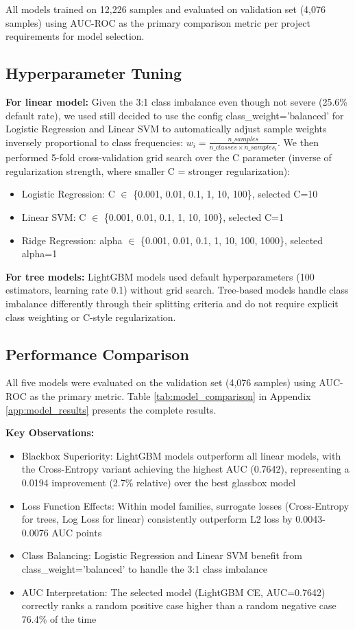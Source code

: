 \documentclass[12pt]{article}
\begin{document}
All models trained on 12,226 samples and evaluated on validation set (4,076 samples) using AUC-ROC as the primary comparison metric per project requirements for model selection.

\subsection{Hyperparameter Tuning} 

\textbf{For linear model: }Given the 3:1 class imbalance even though not severe (25.6\% default rate), we used still decided to use the config class\_weight='balanced' for Logistic Regression and Linear SVM to automatically adjust sample weights inversely proportional to class frequencies: $w_i = \frac{n\_samples}{n\_classes \times n\_samples_i}$. We then performed 5-fold cross-validation grid search over the C parameter (inverse of regularization strength, where smaller C = stronger regularization):

\begin{itemize}
    \item Logistic Regression: C $\in$ \{0.001, 0.01, 0.1, 1, 10, 100\}, selected C=10
    \item Linear SVM: C $\in$ \{0.001, 0.01, 0.1, 1, 10, 100\}, selected C=1
    \item Ridge Regression: alpha $\in$ \{0.001, 0.01, 0.1, 1, 10, 100, 1000\}, selected alpha=1
\end{itemize}

\textbf{For tree models:} LightGBM models used default hyperparameters (100 estimators, learning rate 0.1) without grid search. Tree-based models handle class imbalance differently through their splitting criteria and do not require explicit class weighting or C-style regularization.

\subsection{Performance Comparison}

All five models were evaluated on the validation set (4,076 samples) using AUC-ROC as the primary metric. Table \ref{tab:model_comparison} in Appendix \ref{app:model_results} presents the complete results.

\textbf{Key Observations:}
\begin{itemize}
    \item Blackbox Superiority: LightGBM models outperform all linear models, with the Cross-Entropy variant achieving the highest AUC (0.7642), representing a 0.0194 improvement (2.7\% relative) over the best glassbox model
    \item Loss Function Effects: Within model families, surrogate losses (Cross-Entropy for trees, Log Loss for linear) consistently outperform L2 loss by 0.0043-0.0076 AUC points
    \item Class Balancing: Logistic Regression and Linear SVM benefit from class\_weight='balanced' to handle the 3:1 class imbalance
    \item AUC Interpretation: The selected model (LightGBM CE, AUC=0.7642) correctly ranks a random positive case higher than a random negative case 76.4\% of the time
\end{itemize}
\end{document}
